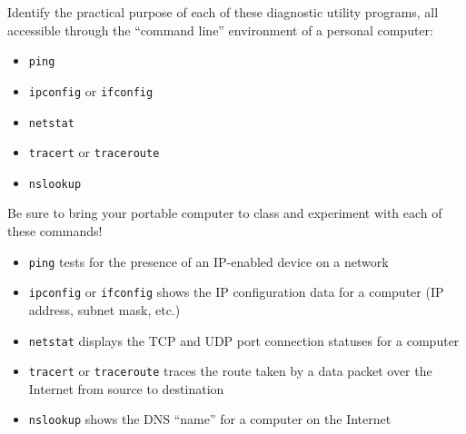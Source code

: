 

Identify the practical purpose of each of these diagnostic utility programs, all accessible through the ``command line'' environment of a personal computer:

\begin{itemize}
\item{} {\tt ping}
\vskip 10pt
\item{} {\tt ipconfig} or {\tt ifconfig}
\vskip 10pt
\item{} {\tt netstat}
\vskip 10pt
\item{} {\tt tracert} or {\tt traceroute}
\vskip 10pt
\item{} {\tt nslookup}
\end{itemize}

Be sure to bring your portable computer to class and experiment with each of these commands!







\begin{itemize}
\item{} {\tt ping} tests for the presence of an IP-enabled device on a network
\vskip 10pt
\item{} {\tt ipconfig} or {\tt ifconfig} shows the IP configuration data for a computer (IP address, subnet mask, etc.)
\vskip 10pt
\item{} {\tt netstat} displays the TCP and UDP port connection statuses for a computer
\vskip 10pt
\item{} {\tt tracert} or {\tt traceroute} traces the route taken by a data packet over the Internet from source to destination
\vskip 10pt
\item{} {\tt nslookup} shows the DNS ``name'' for a computer on the Internet
\end{itemize}











